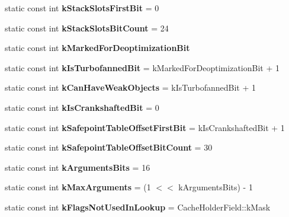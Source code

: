 \begin{DoxyCompactItemize}
\item 
static const int {\bfseries k\+Stack\+Slots\+First\+Bit} = 0\hypertarget{classv8_1_1internal_1_1_code_a03a270ff255c59702aa8358d304951c3}{}\label{classv8_1_1internal_1_1_code_a03a270ff255c59702aa8358d304951c3}

\item 
static const int {\bfseries k\+Stack\+Slots\+Bit\+Count} = 24\hypertarget{classv8_1_1internal_1_1_code_af38fae3df9a17adb0c9e17400c98aa61}{}\label{classv8_1_1internal_1_1_code_af38fae3df9a17adb0c9e17400c98aa61}

\item 
static const int {\bfseries k\+Marked\+For\+Deoptimization\+Bit}
\item 
static const int {\bfseries k\+Is\+Turbofanned\+Bit} = k\+Marked\+For\+Deoptimization\+Bit + 1\hypertarget{classv8_1_1internal_1_1_code_a2fb5e36f79d2194b5ea3d032c48a817b}{}\label{classv8_1_1internal_1_1_code_a2fb5e36f79d2194b5ea3d032c48a817b}

\item 
static const int {\bfseries k\+Can\+Have\+Weak\+Objects} = k\+Is\+Turbofanned\+Bit + 1\hypertarget{classv8_1_1internal_1_1_code_a7a45b333aa64fba01701f964d2520a60}{}\label{classv8_1_1internal_1_1_code_a7a45b333aa64fba01701f964d2520a60}

\item 
static const int {\bfseries k\+Is\+Crankshafted\+Bit} = 0\hypertarget{classv8_1_1internal_1_1_code_ac60d8a948757ebf178d6a8e92d7808f1}{}\label{classv8_1_1internal_1_1_code_ac60d8a948757ebf178d6a8e92d7808f1}

\item 
static const int {\bfseries k\+Safepoint\+Table\+Offset\+First\+Bit} = k\+Is\+Crankshafted\+Bit + 1\hypertarget{classv8_1_1internal_1_1_code_ac4e59439f2a880983728c9b63a00108d}{}\label{classv8_1_1internal_1_1_code_ac4e59439f2a880983728c9b63a00108d}

\item 
static const int {\bfseries k\+Safepoint\+Table\+Offset\+Bit\+Count} = 30\hypertarget{classv8_1_1internal_1_1_code_abde606dd75a661d8662f0e253721ead5}{}\label{classv8_1_1internal_1_1_code_abde606dd75a661d8662f0e253721ead5}

\item 
static const int {\bfseries k\+Arguments\+Bits} = 16\hypertarget{classv8_1_1internal_1_1_code_afc85158e43b6593d59c6438ce9ddf8ab}{}\label{classv8_1_1internal_1_1_code_afc85158e43b6593d59c6438ce9ddf8ab}

\item 
static const int {\bfseries k\+Max\+Arguments} = (1 $<$$<$ k\+Arguments\+Bits) -\/ 1\hypertarget{classv8_1_1internal_1_1_code_a9115cb13cc6486de35b21a2bb82aee65}{}\label{classv8_1_1internal_1_1_code_a9115cb13cc6486de35b21a2bb82aee65}

\item 
static const int {\bfseries k\+Flags\+Not\+Used\+In\+Lookup} = Cache\+Holder\+Field\+::k\+Mask\hypertarget{classv8_1_1internal_1_1_code_a9adebc0535aeb461df71fa7ca03f2fed}{}\label{classv8_1_1internal_1_1_code_a9adebc0535aeb461df71fa7ca03f2fed}

\end{DoxyCompactItemize}
